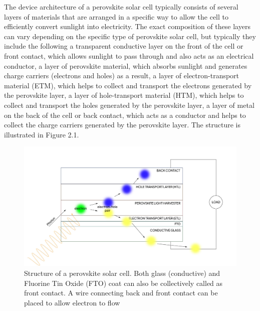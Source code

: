 The device architecture of a perovskite solar cell typically consists of several layers of materials that are arranged in a specific way to allow the cell to efficiently convert sunlight into electricity. The exact composition of these layers can vary depending on the specific type of perovskite solar cell, but typically they include the following a transparent conductive layer on the front of the cell or front contact, which allows sunlight to pass through and also acts as an electrical conductor, a layer of perovskite material, which absorbs sunlight and generates charge carriers (electrons and holes) as a result, a layer of electron-transport material (ETM), which helps to collect and transport the electrons generated by the perovskite layer, a layer of hole-transport material (HTM), which helps to collect and transport the holes generated by the perovskite layer, a layer of metal on the back of the cell or back contact, which acts as a conductor and helps to collect the charge carriers generated by the perovskite layer. The structure is illustrated in Figure 2.1.
\begin{figure}[H]
\includegraphics[width=14 cm]{img-content/psc-mechanism2.jpg}
\caption{Structure of a perovskite solar cell. Both glass (conductive) and Fluorine Tin Oxide (FTO) coat can also be collectively called as front contact. A wire connecting back and front contact can be placed to allow electron to flow\label{fig1}}
\end{figure}   
